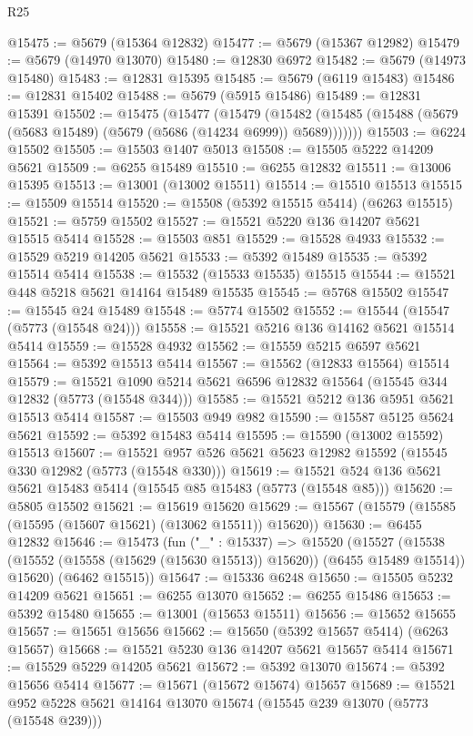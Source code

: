 \begin{lexlean}{R25}
\begin{coremodule}
@15475 := @5679 (@15364 @12832)
@15477 := @5679 (@15367 @12982)
@15479 := @5679 (@14970 @13070)
@15480 := @12830 @6972
@15482 := @5679 (@14973 @15480)
@15483 := @12831 @15395
@15485 := @5679 (@6119 @15483)
@15486 := @12831 @15402
@15488 := @5679 (@5915 @15486)
@15489 := @12831 @15391
@15502 := @15475
    (@15477
      (@15479
        (@15482 (@15485 (@15488 (@5679 (@5683 @15489) (@5679 (@5686 (@14234 @6999)) @5689)))))))
@15503 := @6224 @15502
@15505 := @15503 @1407 @5013
@15508 := @15505 @5222 @14209 @5621
@15509 := @6255 @15489
@15510 := @6255 @12832
@15511 := @13006 @15395
@15513 := @13001 (@13002 @15511)
@15514 := @15510 @15513
@15515 := @15509 @15514
@15520 := @15508 (@5392 @15515 @5414) (@6263 @15515)
@15521 := @5759 @15502
@15527 := @15521 @5220 @136 @14207 @5621 @15515 @5414
@15528 := @15503 @851
@15529 := @15528 @4933
@15532 := @15529 @5219 @14205 @5621
@15533 := @5392 @15489
@15535 := @5392 @15514 @5414
@15538 := @15532 (@15533 @15535) @15515
@15544 := @15521 @448 @5218 @5621 @14164 @15489 @15535
@15545 := @5768 @15502
@15547 := @15545 @24 @15489
@15548 := @5774 @15502
@15552 := @15544 (@15547 (@5773 (@15548 @24)))
@15558 := @15521 @5216 @136 @14162 @5621 @15514 @5414
@15559 := @15528 @4932
@15562 := @15559 @5215 @6597 @5621
@15564 := @5392 @15513 @5414
@15567 := @15562 (@12833 @15564) @15514
@15579 := @15521 @1090 @5214 @5621 @6596 @12832 @15564 (@15545 @344 @12832 (@5773 (@15548 @344)))
@15585 := @15521 @5212 @136 @5951 @5621 @15513 @5414
@15587 := @15503 @949 @982
@15590 := @15587 @5125 @5624 @5621
@15592 := @5392 @15483 @5414
@15595 := @15590 (@13002 @15592) @15513
@15607 := @15521 @957 @526 @5621 @5623 @12982 @15592 (@15545 @330 @12982 (@5773 (@15548 @330)))
@15619 := @15521 @524 @136 @5621 @5621 @15483 @5414 (@15545 @85 @15483 (@5773 (@15548 @85)))
@15620 := @5805 @15502
@15621 := @15619 @15620
@15629 := @15567 (@15579 (@15585 (@15595 (@15607 @15621) (@13062 @15511)) @15620))
@15630 := @6455 @12832
@15646 := @15473
    (fun ("_" : @15337) =>
    @15520
      (@15527
        (@15538 (@15552 (@15558 (@15629 (@15630 @15513)) @15620)) (@6455 @15489 @15514))
        @15620)
      (@6462 @15515))
@15647 := @15336 @6248
@15650 := @15505 @5232 @14209 @5621
@15651 := @6255 @13070
@15652 := @6255 @15486
@15653 := @5392 @15480
@15655 := @13001 (@15653 @15511)
@15656 := @15652 @15655
@15657 := @15651 @15656
@15662 := @15650 (@5392 @15657 @5414) (@6263 @15657)
@15668 := @15521 @5230 @136 @14207 @5621 @15657 @5414
@15671 := @15529 @5229 @14205 @5621
@15672 := @5392 @13070
@15674 := @5392 @15656 @5414
@15677 := @15671 (@15672 @15674) @15657
@15689 := @15521 @952 @5228 @5621 @14164 @13070 @15674 (@15545 @239 @13070 (@5773 (@15548 @239)))

\end{coremodule}
\end{lexlean}
